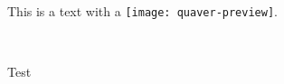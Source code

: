 \documentclass{scrartcl}
\newcommand{\quaver}{\texttt{[image: quaver-preview]}\hspace*{-0.5ex}}
\begin{document}
This is a text with a \quaver.

\the{}\font\\
\Large
\the{}\font


	\normalsize 
	\def\normalpointsize{\the{}\font}


\normalpointsize

Test
\end{document}
